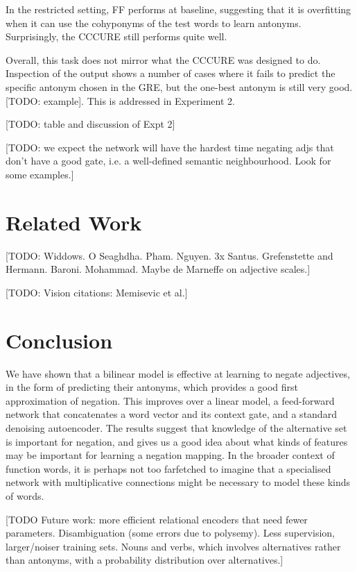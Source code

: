 \documentclass[11pt]{article}
\begin{document}
In the restricted setting, FF performs at baseline, suggesting that it is overfitting when it can use the cohyponyms of the test words to learn antonyms. Surprisingly, the CCCURE still performs quite well.

Overall, this task does not mirror what the CCCURE was designed to do. Inspection of the output shows a number of cases where it fails to predict the specific antonym chosen in the GRE, but the one-best antonym is still very good. [TODO: example]. This is addressed in Experiment 2.

[TODO: table and discussion of Expt 2]

[TODO: we expect the network will have the hardest time negating adjs that don't have a good gate, i.e. a well-defined semantic neighbourhood. Look for some examples.]


\section{Related Work}

[TODO: Widdows. O Seaghdha. Pham. Nguyen. 3x Santus. Grefenstette and Hermann. Baroni. Mohammad. Maybe de Marneffe on adjective scales.]

[TODO: Vision citations: Memisevic et al.]

\section{Conclusion}

We have shown that a bilinear model is effective at learning to negate adjectives, in the form of predicting their antonyms, which provides a good first approximation of negation. This improves over a linear model, a feed-forward network that concatenates a word vector and its context gate, and a standard denoising autoencoder. The results suggest that knowledge of the alternative set is important for negation, and gives us a good idea about what kinds of features may be important for learning a negation mapping. In the broader context of function words, it is perhaps not too farfetched to imagine that a specialised network with multiplicative connections might be necessary to model these kinds of words.

[TODO Future work: more efficient relational encoders that need fewer parameters. Disambiguation (some errors due to polysemy). Less supervision, larger/noiser training sets. Nouns and verbs, which involves alternatives rather than antonyms, with a probability distribution over alternatives.]



\end{document}
